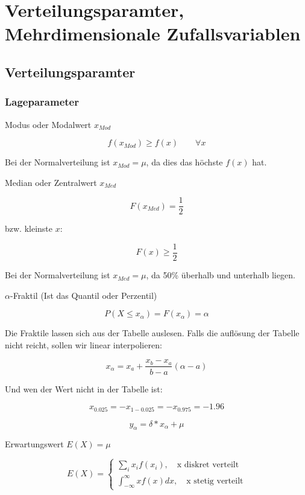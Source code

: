 \documentclass[a4paper]{article}
\title{\docTitle}
\author{Moritz}
\date{\today}
\begin{document}
\maketitle
\tableofcontents


\section{Verteilungsparamter, Mehrdimensionale Zufallsvariablen}

\subsection{Verteilungsparamter}

\subsubsection{Lageparameter}

Modus oder Modalwert $x_{Mod}$

\[
f(x_{Mod}) \geq f(x) \qquad \forall x
\]

Bei der Normalverteilung ist $x_{Mod}=\mu$, da dies das höchste $f(x)$ hat.

Median oder Zentralwert $x_{Med}$

\[
F(x_{Med}) = \frac{1}{2}
\]

bzw. kleinste $x$:

\[
F(x) \geq \frac{1}{2}
\]

Bei der Normalverteilung ist $x_{Med}=\mu$, da 50\% überhalb und unterhalb liegen.

$\alpha$-Fraktil (Ist das Quantil oder Perzentil)

\[
P(X \leq x_\alpha) = F(x_\alpha) = \alpha
\]

Die Fraktile lassen sich aus der Tabelle auslesen. Falls die auflösung der Tabelle nicht reicht, sollen wir linear interpolieren:

\[
x_\alpha = x_a + \frac{x_b - x_a}{b-a}(\alpha - a)
\]

Und wen der Wert nicht in der Tabelle ist:

\[
x_{0.025} = -x_{1-0.025} = -x_{0.975} = -1.96
\]

\[
y_\alpha = \delta*x_\alpha + \mu
\]

Erwartungswert $E(X) = \mu$

\[
E(X) = \begin{cases}
    \sum_i x_i f(x_i), \quad \text{x diskret verteilt}\\
    \int_{-\infty}^{\infty} xf(x) dx, \quad \text{x stetig verteilt}
\end{cases}
\]
\end{document}
